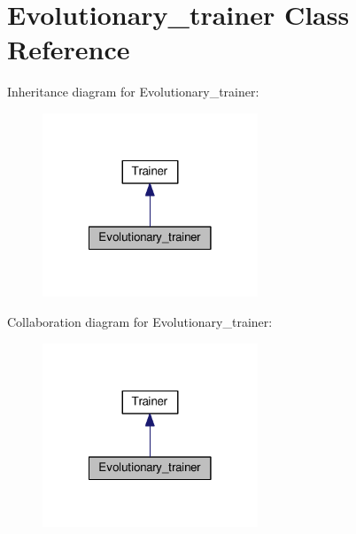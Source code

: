 \hypertarget{classEvolutionary__trainer}{\section{Evolutionary\-\_\-trainer Class Reference}
\label{classEvolutionary__trainer}
}


Inheritance diagram for Evolutionary\-\_\-trainer\-:
\nopagebreak
\begin{figure}[H]
\begin{center}
\leavevmode
\includegraphics[width=182pt]{classEvolutionary__trainer__inherit__graph}
\end{center}
\end{figure}


Collaboration diagram for Evolutionary\-\_\-trainer\-:
\nopagebreak
\begin{figure}[H]
\begin{center}
\leavevmode
\includegraphics[width=182pt]{classEvolutionary__trainer__coll__graph}
\end{center}
\end{figure}
